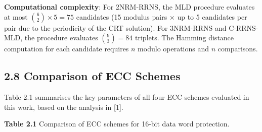 \textbf{Computational complexity}: For 2NRM-RRNS, the MLD procedure
evaluates at most \(\binom{6}{2} \times 5 = 75\) candidates (15 modulus
pairs × up to 5 candidates per pair due to the periodicity of the CRT
solution). For 3NRM-RRNS and C-RRNS-MLD, the procedure evaluates
\(\binom{9}{3} = 84\) triplets. The Hamming distance computation for
each candidate requires \(n\) modulo operations and \(n\) comparisons.

\subsection{2.8 Comparison of ECC
Schemes}\label{comparison-of-ecc-schemes}

Table 2.1 summarises the key parameters of all four ECC schemes
evaluated in this work, based on the analysis in {[}1{]}.

\textbf{Table 2.1} Comparison of ECC schemes for 16-bit data word
protection.

